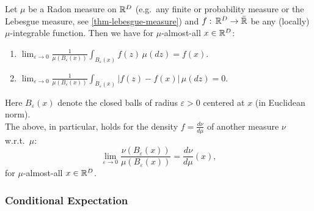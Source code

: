 \begin{Thm}
    \label{besicovitch-density}
Let $\mu$ be a Radon measure on $\mathbb{R}^D$ (e.g.\ any finite or probability measure or the Lebesgue measure, see \ref{thm-lebesgue-measure}) and $f:\,\mathbb{R}^D \to \bar{\mathbb{R}}$ be any (locally) $\mu$-integrable function.
    Then we have for $\mu$-almost-all $x \in \mathbb{R}^D$:
    \begin{enumerate}
        \item $\displaystyle \lim_{\varepsilon \to 0} \frac{1}{\mu( B_\varepsilon(x))} \int_{B_\varepsilon(x)}f(z)\,\mu(dz) = f(x).$   
        \item $\displaystyle \lim_{\varepsilon \to 0} \frac{1}{\mu( B_\varepsilon(x))} \int_{B_\varepsilon(x)}|f(z) - f(x)|\,\mu(dz) = 0$. 
    \end{enumerate}
    Here $B_\varepsilon(x)$ denote the closed balls of radius $\varepsilon>0$ centered at $x$ (in Euclidean norm).\\
    The above, in particular, holds for the density $f=\frac{d\nu}{d\mu}$ of another measure $\nu$ w.r.t.\ $\mu$:
    \[  \lim_{\varepsilon \to 0} \frac{\nu( B_\varepsilon(x))} {\mu( B_\varepsilon(x))}  = \frac{d\nu}{d\mu}(x), \]
    for $\mu$-almost-all $x \in \mathbb{R}^D$.
\end{Thm}

\subsubsection{Conditional Expectation}

